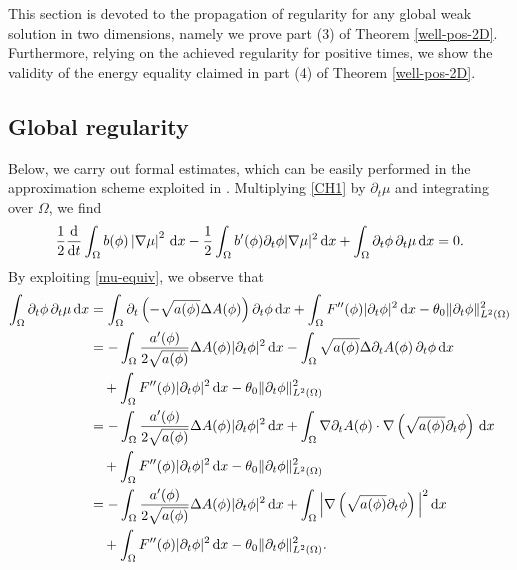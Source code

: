 \documentclass[11pt,reqno]{amsart}
\theoremstyle{remark}
\def\d{{\rm d}}
\def\ddt{\frac{\d}{\d t}}
\numberwithin{equation}{section}
\def\d{{\rm d}}
\begin{document}
This section is devoted to the propagation of regularity for any global weak solution in two dimensions, namely we prove part (3) of Theorem \ref{well-pos-2D}. Furthermore, relying on the achieved regularity for positive times, we show the validity of the energy equality claimed in part (4) of Theorem \ref{well-pos-2D}.

\subsection{Global regularity}
Below, we carry out formal estimates, which can be easily performed in the approximation scheme exploited in \cite{SP2013}. Multiplying \eqref{CH1} by $\partial_t \mu$ and integrating over $\Omega$, we find
\begin{equation}\label{counts}
\frac{1}{2}\ddt  \int_{\Omega} b(\phi) \left|\nabla \mu \right|^2 \, \d x  - \frac{1}{2} \int_{\Omega} b'(\phi) \partial_t \phi  |\nabla \mu|^2  \, \d x
+ \int_\Omega \partial_t \phi \, \partial_t \mu \, \d x =0.
\end{equation}
By exploiting \eqref{mu-equiv}, we observe that
\begin{align*}
\int_\Omega \partial_t \phi \, \partial_t \mu \, \d x
&=
\int_\Omega \partial_t \left( -\sqrt{a(\phi)} \Delta A(\phi)\right) \partial_t \phi \, \d x
+ \int_\Omega F''(\phi)|\partial_t \phi|^2 \, \d x - \theta_0 \| \partial_t \phi\|_{L^2(\Omega)}^2
\\
&= - \int_\Omega \frac{a'(\phi)}{2\sqrt{a(\phi)}} \Delta A(\phi) |\partial_t \phi|^2 \, \d x
- \int_\Omega \sqrt{a(\phi)} \Delta \partial_t A(\phi) \, \partial_t \phi \, \d x
\\
&\quad + \int_\Omega F''(\phi)|\partial_t \phi|^2 \, \d x - \theta_0 \| \partial_t \phi\|_{L^2(\Omega)}^2
\\
&=- \int_\Omega \frac{a'(\phi)}{2\sqrt{a(\phi)}} \Delta A(\phi) |\partial_t \phi|^2 \, \d x
+ \int_\Omega  \nabla \partial_t A(\phi) \cdot \nabla \left( \sqrt{a(\phi)}\partial_t \phi \right) \, \d x
\\
&\quad + \int_\Omega F''(\phi)|\partial_t \phi|^2 \, \d x - \theta_0 \| \partial_t \phi\|_{L^2(\Omega)}^2
\\
&=- \int_\Omega \frac{a'(\phi)}{2\sqrt{a(\phi)}} \Delta A(\phi) |\partial_t \phi|^2 \, \d x
+ \int_\Omega  \Big| \nabla \left( \sqrt{a(\phi)}\partial_t \phi \right) \Big|^2 \, \d x
\\
&\quad + \int_\Omega F''(\phi)|\partial_t \phi|^2 \, \d x - \theta_0 \| \partial_t \phi\|_{L^2(\Omega)}^2.
\end{align*}
\end{document}

